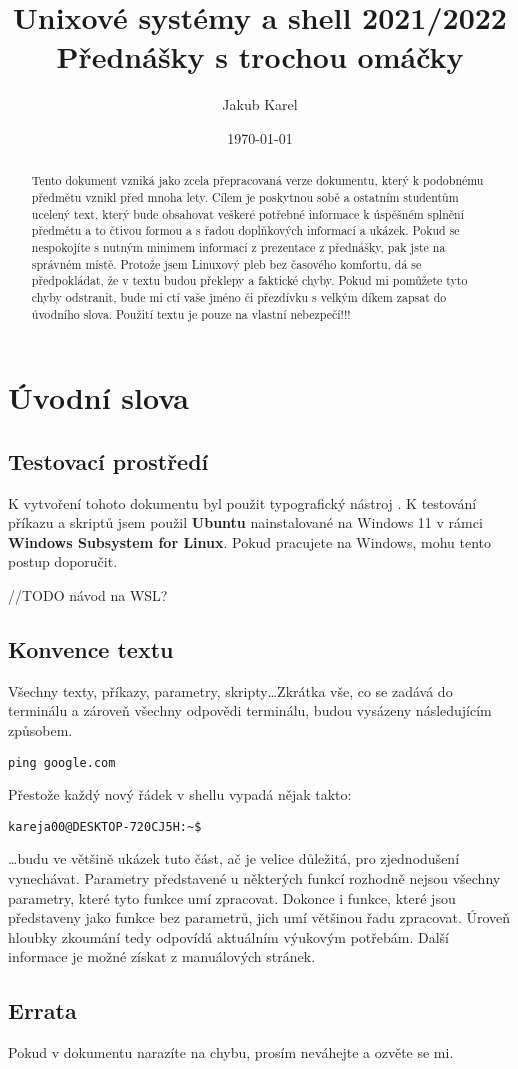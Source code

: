 \documentclass{article}
\title{\Huge{Unixové systémy a shell 2021/2022}\\
\vspace{1em}
\normalsize{Přednášky s trochou omáčky}}
\author{\normalsize Jakub Karel}
\date{\today}
\begin{document}
\maketitle
\begin{abstract}
Tento dokument vzniká jako zcela přepracovaná verze dokumentu, který k podobnému předmětu vznikl před mnoha lety. Cílem je poskytnou sobě a ostatním studentům ucelený text, který bude obsahovat veškeré potřebné informace k úspěšném splnění předmětu a to čtivou formou a s řadou doplňkových informací a ukázek. Pokud se nespokojíte s nutným minimem informací z prezentace z přednášky, pak jste na správném místě. Protože jsem Linuxový pleb bez časového komfortu, dá se předpokládat, že v textu budou překlepy a faktické chyby. Pokud mi pomůžete tyto chyby odstranit, bude mi ctí vaše jméno či přezdívku s velkým díkem zapsat do úvodního slova. Použití textu je pouze na vlastní nebezpečí!!!
\end{abstract}

\thispagestyle{empty}
\newpage
\thispagestyle{empty}
\tableofcontents
\thispagestyle{empty}
\newpage
\setcounter{page}{1}

\section{Úvodní slova}
\subsection{Testovací prostředí}
K vytvoření tohoto dokumentu byl použit typografický nástroj \LaTeXe. K testování příkazu a skriptů jsem použil {\bf Ubuntu} nainstalované na Windows 11 v rámci {\bf Windows Subsystem for Linux}. Pokud pracujete na Windows, mohu tento postup doporučit.

//TODO návod na WSL?

\subsection{Konvence textu}
Všechny texty, příkazy, parametry, skripty\dots Zkrátka vše, co se zadává do terminálu a zároveň všechny odpovědi terminálu, budou vysázeny následujícím způsobem.
\begin{verbatim}
ping google.com
\end{verbatim}
Přestože každý nový řádek v shellu vypadá nějak takto:
\begin{verbatim}
kareja00@DESKTOP-720CJ5H:~$
\end{verbatim}
\dots budu ve většině ukázek tuto část, ač je velice důležitá, pro zjednodušení vynechávat. Parametry představené u některých funkcí rozhodně nejsou všechny parametry, které tyto funkce umí zpracovat. Dokonce i funkce, které jsou představeny jako funkce bez parametrů, jich umí většinou řadu zpracovat. Úroveň hloubky zkoumání tedy odpovídá aktuálním výukovým potřebám. Další informace je možné získat z manuálových stránek.

\subsection{Errata}
Pokud v dokumentu narazíte na chybu, prosím neváhejte a ozvěte se mi.

\newpage
\end{document}
